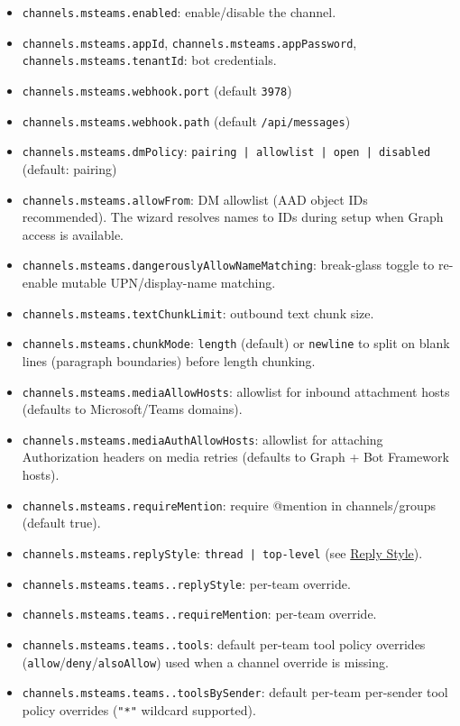 \begin{itemize}
  \item \texttt{channels.msteams.enabled}: enable/disable the channel.
  \item \texttt{channels.msteams.appId}, \texttt{channels.msteams.appPassword}, \texttt{channels.msteams.tenantId}: bot credentials.
  \item \texttt{channels.msteams.webhook.port} (default \texttt{3978})
  \item \texttt{channels.msteams.webhook.path} (default \texttt{/api/messages})
  \item \texttt{channels.msteams.dmPolicy}: \texttt{pairing | allowlist | open | disabled} (default: pairing)
  \item \texttt{channels.msteams.allowFrom}: DM allowlist (AAD object IDs recommended). The wizard resolves names to IDs during setup when Graph access is available.
  \item \texttt{channels.msteams.dangerouslyAllowNameMatching}: break-glass toggle to re-enable mutable UPN/display-name matching.
  \item \texttt{channels.msteams.textChunkLimit}: outbound text chunk size.
  \item \texttt{channels.msteams.chunkMode}: \texttt{length} (default) or \texttt{newline} to split on blank lines (paragraph boundaries) before length chunking.
  \item \texttt{channels.msteams.mediaAllowHosts}: allowlist for inbound attachment hosts (defaults to Microsoft/Teams domains).
  \item \texttt{channels.msteams.mediaAuthAllowHosts}: allowlist for attaching Authorization headers on media retries (defaults to Graph + Bot Framework hosts).
  \item \texttt{channels.msteams.requireMention}: require @mention in channels/groups (default true).
  \item \texttt{channels.msteams.replyStyle}: \texttt{thread | top-level} (see \href{\#reply-style-threads-vs-posts}{Reply Style}).
  \item \texttt{channels.msteams.teams..replyStyle}: per-team override.
  \item \texttt{channels.msteams.teams..requireMention}: per-team override.
  \item \texttt{channels.msteams.teams..tools}: default per-team tool policy overrides (\texttt{allow}/\texttt{deny}/\texttt{alsoAllow}) used when a channel override is missing.
  \item \texttt{channels.msteams.teams..toolsBySender}: default per-team per-sender tool policy overrides (\texttt{"*"} wildcard supported).

\end{itemize}
